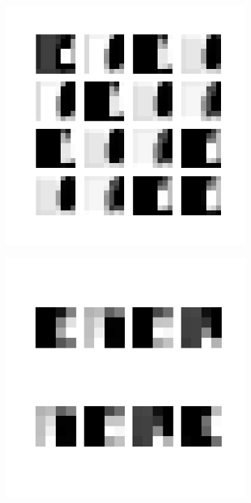 \begin{figure}
\begin{subfigure}[b]{0.40\linewidth}
    \end{subfigure}
    \\[-0.5cm]
    \begin{subfigure}[b]{0.40\linewidth}
        \includegraphics[width=\linewidth]{images/cae_online_lstm/caelstm_section_cae_training_block_map_10000_model_feature_maps_map_0_0_1.png}
    \end{subfigure}
    \hfill
    \begin{subfigure}[b]{0.40\linewidth}
        \includegraphics[width=\linewidth]{images/cae_online_lstm/caelstm_section_cae_training_block_map_10000_model_feature_maps_map_0_0_0.png}

\end{subfigure}
\end{figure}
